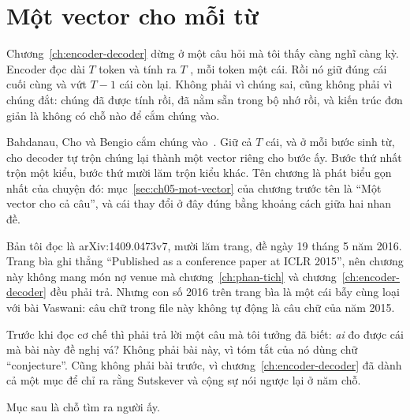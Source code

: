 \chapter{Một vector cho mỗi từ}
\label{ch:mot-vector-cho-moi-tu}

Chương~\ref{ch:encoder-decoder} dừng ở một câu hỏi mà tôi thấy càng nghĩ càng
kỳ. Encoder đọc  dài \(T\) token và tính ra \(T\)
, mỗi token một cái. Rồi nó giữ đúng cái cuối
cùng và vứt \(T - 1\) cái còn lại. Không phải vì chúng sai, cũng không phải vì
chúng đắt: chúng đã được tính rồi, đã nằm sẵn trong bộ nhớ rồi, và kiến trúc
đơn giản là không có chỗ nào để cắm chúng vào.

Bahdanau, Cho và Bengio cắm chúng vào~\autocite{bahdanau2015align}. Giữ cả
\(T\) cái, và ở mỗi bước sinh từ, cho decoder tự trộn chúng lại thành một vector
riêng cho bước ấy. Bước thứ nhất trộn một kiểu, bước thứ mười lăm trộn kiểu
khác. Tên chương là phát biểu gọn nhất của chuyện đó:
mục~\ref{sec:ch05-mot-vector} của chương trước tên là \enquote{Một vector cho cả
câu}, và cái thay đổi ở đây đúng bằng khoảng cách giữa hai nhan đề.

Bản tôi đọc là arXiv:1409.0473v7, mười lăm trang, đề ngày 19 tháng 5 năm 2016.
Trang bìa ghi thẳng \enquote{Published as a conference paper at ICLR 2015}, nên
chương này không mang món nợ venue mà chương~\ref{ch:phan-tich} và
chương~\ref{ch:encoder-decoder} đều phải trả. Nhưng con số 2016 trên trang bìa
là một cái bẫy cùng loại với bài Vaswani: câu chữ trong file này không tự động
là câu chữ của năm 2015.

Trước khi đọc cơ chế thì phải trả lời một câu mà tôi tưởng đã biết: \emph{ai}
đo được cái  mà bài này đề nghị vá? Không phải bài
này, vì tóm tắt của nó dùng chữ \enquote{conjecture}. Cũng không phải bài
trước, vì chương~\ref{ch:encoder-decoder} đã dành cả một mục để chỉ ra rằng
Sutskever và cộng sự nói ngược lại ở năm chỗ.

Mục sau là chỗ tìm ra người ấy.










